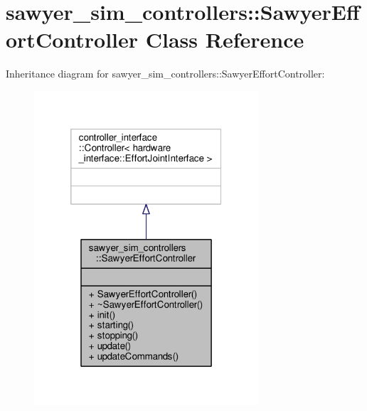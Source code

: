 \hypertarget{classsawyer__sim__controllers_1_1_sawyer_effort_controller}{\section{sawyer\-\_\-sim\-\_\-controllers\-:\-:Sawyer\-Effort\-Controller Class Reference}
\label{classsawyer__sim__controllers_1_1_sawyer_effort_controller}
}


Inheritance diagram for sawyer\-\_\-sim\-\_\-controllers\-:\-:Sawyer\-Effort\-Controller\-:
\nopagebreak
\begin{figure}[H]
\begin{center}
\leavevmode
\includegraphics[width=236pt]{classsawyer__sim__controllers_1_1_sawyer_effort_controller__inherit__graph}
\end{center}
\end{figure}


